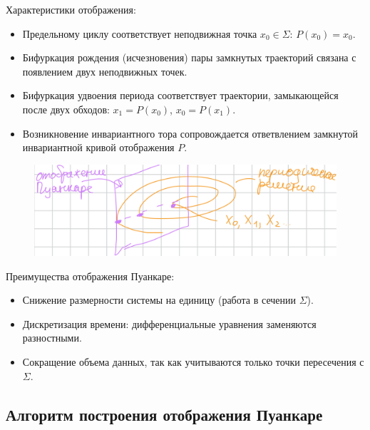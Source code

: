 	Характеристики отображения:
	\begin{itemize}
		\item Предельному циклу соответствует неподвижная точка \(x_0 \in \Sigma\): \(P(x_0) = x_0\).
		\item Бифуркация рождения (исчезновения) пары замкнутых траекторий связана с появлением двух неподвижных точек.
		\item Бифуркация удвоения периода соответствует траектории, замыкающейся после двух обходов: \(x_1 = P(x_0)\), \(x_0 = P(x_1)\).
		\item Возникновение инвариантного тора сопровождается ответвлением замкнутой инвариантной кривой отображения \(P\).
	\end{itemize}
	\vspace{-1em}
	\begin{figure}[H]
		\centering
		\includegraphics[width=1\linewidth, height=0.15\textheight]{img/14_04}
		\label{fig:14_04}
	\end{figure}
	\vspace{-2em}
	Преимущества отображения Пуанкаре:
	\begin{itemize}
		\item Снижение размерности системы на единицу (работа в сечении \(\Sigma\)).
		\item Дискретизация времени: дифференциальные уравнения заменяются разностными.
		\item Сокращение объема данных, так как учитываются только точки пересечения с \(\Sigma\).
	\end{itemize}
	
	\subsection{Алгоритм построения отображения Пуанкаре}
	
